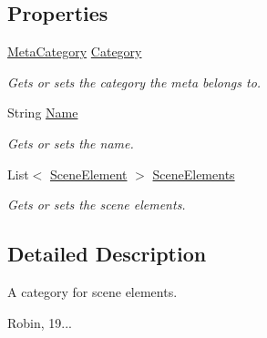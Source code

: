 \subsection*{Properties}
\begin{DoxyCompactItemize}
\item 
\hyperlink{namespace_a_rdev_kit_1_1_controller_1_1_editor_controller_a304367964b3f3f5c115bb81e7b31d534}{Meta\-Category} \hyperlink{class_a_rdev_kit_1_1_controller_1_1_editor_controller_1_1_scene_element_category_a3b683fe0bda9ff970f7fbc1099818647}{Category}
\begin{DoxyCompactList}\small\item\em Gets or sets the category the meta belongs to. \end{DoxyCompactList}\item 
String \hyperlink{class_a_rdev_kit_1_1_controller_1_1_editor_controller_1_1_scene_element_category_a0f33148739c409a2fe2210c4e3ece165}{Name}
\begin{DoxyCompactList}\small\item\em Gets or sets the name. \end{DoxyCompactList}\item 
List$<$ \hyperlink{class_a_rdev_kit_1_1_controller_1_1_editor_controller_1_1_scene_element}{Scene\-Element} $>$ \hyperlink{class_a_rdev_kit_1_1_controller_1_1_editor_controller_1_1_scene_element_category_a6e7b2d628b8ea21c13b6f4533a26c7ba}{Scene\-Elements}
\begin{DoxyCompactList}\small\item\em Gets or sets the scene elements. \end{DoxyCompactList}\end{DoxyCompactItemize}


\subsection{Detailed Description}
A category for scene elements. 

Robin, 19... 

